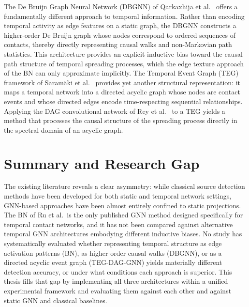 The De Bruijn Graph Neural Network (DBGNN) of Qarkaxhija et al.~\cite{Qarkaxhija2022} offers a fundamentally different approach to temporal information. Rather than encoding temporal activity as edge features on a static graph, the DBGNN constructs a higher-order De Bruijn graph whose nodes correspond to ordered sequences of contacts, thereby directly representing causal walks and non-Markovian path statistics. This architecture provides an explicit inductive bias toward the causal path structure of temporal spreading processes, which the edge texture approach of the BN can only approximate implicitly. The Temporal Event Graph (TEG) framework of Saram\"aki et al.~\cite{Saramaki2019} provides yet another structural representation: it maps a temporal network into a directed acyclic graph whose nodes are contact events and whose directed edges encode time-respecting sequential relationships. Applying the DAG convolutional network of Rey et al.~\cite{Rey2025} to a TEG yields a method that processes the causal structure of the spreading process directly in the spectral domain of an acyclic graph.

\section{Summary and Research Gap}
\label{sec:rw-gap}

The existing literature reveals a clear asymmetry: while classical source detection methods have been developed for both static and temporal network settings, GNN-based approaches have been almost entirely confined to static projections. The BN of Ru et al.\ is the only published GNN method designed specifically for temporal contact networks, and it has not been compared against alternative temporal GNN architectures embodying different inductive biases. No study has systematically evaluated whether representing temporal structure as edge activation patterns (BN), as higher-order causal walks (DBGNN), or as a directed acyclic event graph (TEG-DAG-GNN) yields materially different detection accuracy, or under what conditions each approach is superior. This thesis fills that gap by implementing all three architectures within a unified experimental framework and evaluating them against each other and against static GNN and classical baselines.
